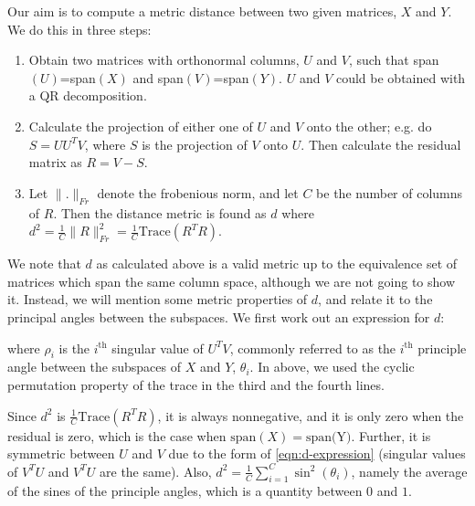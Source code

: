 Our aim is to compute a metric distance between two given matrices, $X$ and $Y$. We do this in three steps:
\begin{enumerate}[label={(\arabic*)}]\itemsep1pt
\item Obtain two matrices with orthonormal columns, $U$ and $V$, such that span$(U)$=span$(X)$ and span$(V)$=span$(Y)$. $U$ and $V$ could be obtained with a QR decomposition.
\item Calculate the projection of either one of $U$ and $V$ onto the other; e.g. do  $S = UU^TV$, where $S$ is the projection of $V$ onto $U$. Then calculate the residual matrix as $R=V-S$.
\item Let $\|.\|_{Fr}$ denote the frobenious norm, and let $C$ be the number of columns of $R$. Then the distance metric is found as $d$ where  $d^2 = \frac{1}{C}\|R\|_{Fr}^2 = \frac{1}{C}\text{Trace}(R^TR)$.
\end{enumerate}
We note that $d$ as calculated above is a valid metric up to the equivalence set of matrices which span the same column space, although we are not going to show it. Instead, we will mention some metric properties of $d$, and relate it to the principal angles between the subspaces. We first work out an expression for $d$:

where $\rho_i$ is the $i^\text{th}$ singular value of $U^TV$, commonly referred to as  the $i^\text{th}$ principle angle between the subspaces of $X$ and $Y$, $\theta_i$. In above, we used the cyclic permutation property of the trace in the third and the fourth lines.

Since $d^2$ is  $\frac{1}{C}\text{Trace}(R^TR)$, it is always nonnegative, and it is only zero when the residual is zero, which is the case when $\text{span}(X)=\text{span(Y)}$. Further, it is symmetric between $U$ and $V$ due to the form of \eqref{eqn:d-expression} (singular values of $V^TU$ and $V^TU$ are the same). Also, $d^2=\frac{1}{C}\sum_{i=1}^C \sin^2(\theta_i)$, namely the average of the sines of the principle angles, which is a quantity between $0$ and $1$.